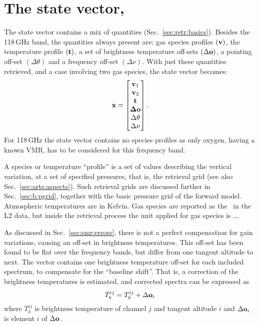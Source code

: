 \section{The state vector, \SttVct}
\label{sec:x}
%
The state vector contains a mix of quantities (Sec.~\ref{sec:retr:basics}).
Besides the 118\,GHz band, the quantities always present are: gas species
profiles $(\mathbf{v})$, the temperature profile $(\mathbf{t})$, a set of
brightness temperature off-sets $(\Delta\mathbf{o})$, a pointing off-set
$(\Delta\theta)$ and a frequency off-set $(\Delta\nu)$. With
just these quantities retrieved, and a case involving two gas species, the
state vector becomes:
\begin{equation}
  \label{eq:x:example}
  \mathbf{x} =
  \begin{bmatrix}
    \mathbf{v}_1\\ 
    \mathbf{v}_2\\ 
    \mathbf{t}\\ 
    \mathbf{\Delta\mathbf{o}}\\ 
    \Delta\theta\\ 
    \Delta\nu 
  \end{bmatrix}.
\end{equation}
For 118\,GHz the state vector contains no species profiles as only oxygen,
having a known VMR, has to be considered for this frequency band.

A species or temperature ``profile'' is a set of values describing the vertical
variation, at a set of specified pressures, that is, the retrieval grid (see
also Sec.~\ref{sec:arts:aspects}). Such retrieval grids are discussed further
in Sec.~\ref{sec:b:pgrid}, together with the basic pressure grid of the forward
model. Atmospheric temperatures are in Kelvin. Gas species are reported as the
\VMR\ in the L2 data, but inside the retrieval process the unit applied for gas
species is \dots.
\\

As discussed in Sec.~\ref{sec:smr:errors}, there is not a perfect compensation
for gain variations, causing an off-set in brightness temperatures. This
off-set has been found to be flat over the frequency bands, but differ from one
tangent altitude to next. The vector  contains one
brightness temperature off-set for each included spectrum, to compensate for
the ``baseline shift''. That is, a correction of the brightness temperatures is
estimated, and corrected spectra can be expressed as
\begin{equation}
  \label{eq:retr:baseline}
  \hat{T}_b^{ij} = T_b^{ij} + \Delta\mathbf{o}_i
\end{equation}
where $T_b^{ij}$ is brightness temperature of channel $j$ and tangent altitude
$i$ and $\Delta\mathbf{o}_i$ is element $i$ of $\Delta\mathbf{o}$.

